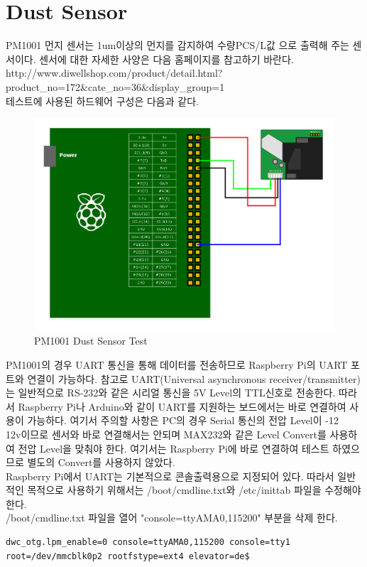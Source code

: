 \documentclass[11pt
  , a4paper
  , article
  , oneside
]{memoir}
\begin{document}
\section{Dust Sensor}
PM1001 먼지 센서는 1um이상의 먼지를 감지하여 수량PCS/L값 으로 출력해 주는 센서이다. 센서에 대한 자세한 
사양은 다음 홈페이지를 참고하기 바란다.\\
http://www.diwellshop.com/product/detail.html?product\_no=172\&cate\_no=36\&display\_group=1\\
테스트에 사용된 하드웨어 구성은 다음과 같다.
\begin{figure}[!htb]
\centering
\includegraphics[width=1\textwidth]{./images/epics/PM1001Test.png}
\caption{PM1001 Dust Sensor Test}
\label{fig:pm1001_epics_test}
\end{figure}
 PM1001의 경우 UART 통신을 통해 데이터를 전송하므로 Raspberry Pi의 UART 포트와 연결이 가능하다. 
참고로 UART(Universal asynchronous receiver/transmitter)는 일반적으로 RS-232와 같은 시리얼 통신을 
5V Level의 TTL신호로 전송한다. 따라서 Raspberry Pi나 Arduino와 같이 UART를 지원하는 보드에서는 바로 
연결하여 사용이 가능하다. 여기서 주의할 사항은 PC의 경우 Serial 통신의 전압 Level이 -12 ~ 12v이므로 
센서와 바로 연결해서는 안되며 MAX232와 같은 Level Convert를 사용하여 전압 Level을 맞춰야 한다. 여기서는 
Raspberry Pi에 바로 연결하여 테스트 하였으므로 별도의 Convert를 사용하지 않았다.\\
Raspberry Pi에서 UART는 기본적으로 콘솔출력용으로 지정되어 있다. 
따라서 일반적인 목적으로 사용하기 위해서는 /boot/cmdline.txt와 /etc/inittab 파일을 수정해야 한다.\\
/boot/cmdline.txt 파일을 열어 "console=ttyAMA0,115200" 부분을 삭제 한다.
\begin{lstlisting}[style=termstyle]
dwc_otg.lpm_enable=0 console=ttyAMA0,115200 console=tty1 root=/dev/mmcblk0p2 rootfstype=ext4 elevator=de$
\end{lstlisting}
\end{document}
